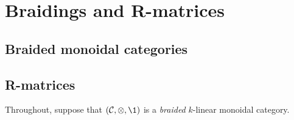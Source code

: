 \section{Braidings and R-matrices}
    \subsection{Braided monoidal categories}

    \subsection{R-matrices}
        \begin{convention}
            Throughout, suppose that $(\C, \tensor, \1)$ is a \textit{braided} $k$-linear monoidal category.
        \end{convention}
    
